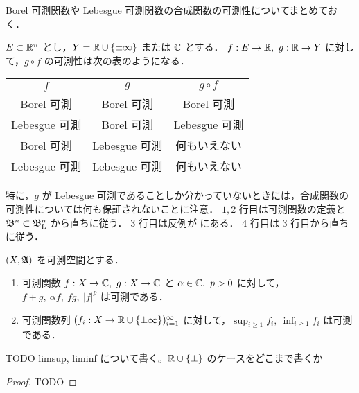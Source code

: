 \begin{remark}
    Borel 可測関数や Lebesgue 可測関数の合成関数の可測性についてまとめておく．

    $E\subset\mathbb{R}^n$ とし，$Y=\mathbb{R}\cup\{\pm\infty\} $ または $\mathbb{C}$ とする．
    $f:E\to\mathbb{R},\ g:\mathbb{R}\to Y$ に対して，$g\circ f$ の可測性は次の表のようになる．

    \begin{table}[h]
        \centering
        \begin{tabular}{|c|c||c|}
            \hline
            $f$ & $g$ & $g\circ f$\\
            \hhline{|=|=#=|}
            Borel 可測 & Borel 可測 & Borel 可測\\
            \hline
            Lebesgue 可測 & Borel 可測 & Lebesgue 可測\\
            \hline
            Borel 可測 & Lebesgue 可測 & 何もいえない\\
            \hline
            Lebesgue 可測 & Lebesgue 可測 & 何もいえない\\
            \hline
        \end{tabular}
    \end{table}

    特に，$g$ が Lebesgue 可測であることしか分かっていないときには，合成関数の可測性については何も保証されないことに注意．
    $1,2$ 行目は可測関数の定義と $\mathfrak{B}^n\subset\mathfrak{B}_{\mathrm{L}}^n$ から直ちに従う．
    $3$ 行目は反例が \cite[\S2 Exercise 9]{Fo99}\cite[pp.72--73]{It63} にある．
    $4$ 行目は $3$ 行目から直ちに従う．
\end{remark}

\begin{theorem}\label{thm:elementary_measuable_functions}
    $(X,\mathfrak{A})$ を可測空間とする．
    \begin{enumerate}
        \item 可測関数 $f:X\to\Cbb,\ g:X\to\Cbb$ と $\alpha\in\Cbb,\ p>0$ に対して，$f+g,\ \alpha f,\ fg,\ |f|^p$ は可測である．
        \item 可測関数列 $(f_i:X\to\mathbb{R}\cup\{\pm\infty\})_{i=1}^\infty$ に対して，$\displaystyle\sup_{i\ge1}f_i,\ \inf_{i\ge1}f_i$ は可測である．
    \end{enumerate}
    {\color{red} TODO limsup, liminf について書く。$\mathbb{R}\cup\{\pm\}$ のケースをどこまで書くか}
\end{theorem}

\begin{proof}
    {\color{red} TODO}
\end{proof}

